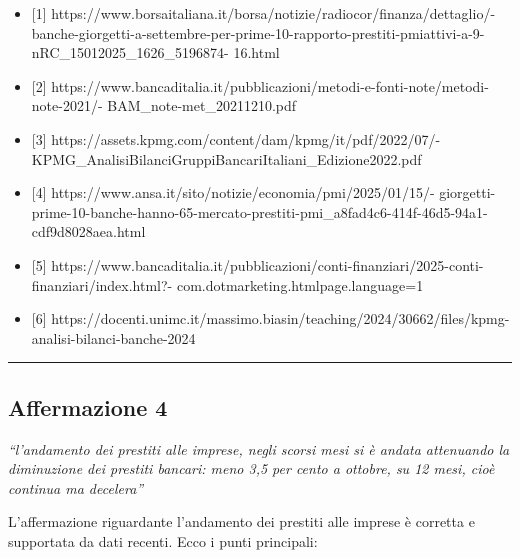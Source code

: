 \documentclass[
  letterpaper,
  DIV=11,
  numbers=noendperiod]{scrartcl}
\providecommand{\tightlist}{%
  \setlength{\itemsep}{0pt}\setlength{\parskip}{0pt}}\usepackage{longtable,booktabs,array}
\begin{document}
\begin{itemize}
\tightlist
\item
  {[}1{]}
  https://www.borsaitaliana.it/borsa/notizie/radiocor/finanza/dettaglio/-
  banche-giorgetti-a-settembre-per-prime-10-rapporto-prestiti-pmiattivi-a-9-nRC\_15012025\_1626\_5196874-
  16.html
\item
  {[}2{]}
  https://www.bancaditalia.it/pubblicazioni/metodi-e-fonti-note/metodi-note-2021/-
  BAM\_note-met\_20211210.pdf
\item
  {[}3{]} https://assets.kpmg.com/content/dam/kpmg/it/pdf/2022/07/-
  KPMG\_AnalisiBilanciGruppiBancariItaliani\_Edizione2022.pdf
\item
  {[}4{]} https://www.ansa.it/sito/notizie/economia/pmi/2025/01/15/-
  giorgetti-prime-10-banche-hanno-65-mercato-prestiti-pmi\_a8fad4c6-414f-46d5-94a1-cdf9d8028aea.html
\item
  {[}5{]}
  https://www.bancaditalia.it/pubblicazioni/conti-finanziari/2025-conti-finanziari/index.html?-
  com.dotmarketing.htmlpage.language=1
\item
  {[}6{]}
  https://docenti.unimc.it/massimo.biasin/teaching/2024/30662/files/kpmg-analisi-bilanci-banche-2024
\end{itemize}

\begin{center}\rule{0.5\linewidth}{0.5pt}\end{center}

\subsection{Affermazione 4}\label{affermazione-4}

\emph{``l'andamento dei prestiti alle imprese, negli scorsi mesi si è
andata attenuando la diminuzione dei prestiti bancari: meno 3,5 per
cento a ottobre, su 12 mesi, cioè continua ma decelera''}

L'affermazione riguardante l'andamento dei prestiti alle imprese è
corretta e supportata da dati recenti. Ecco i punti principali:
\end{document}
